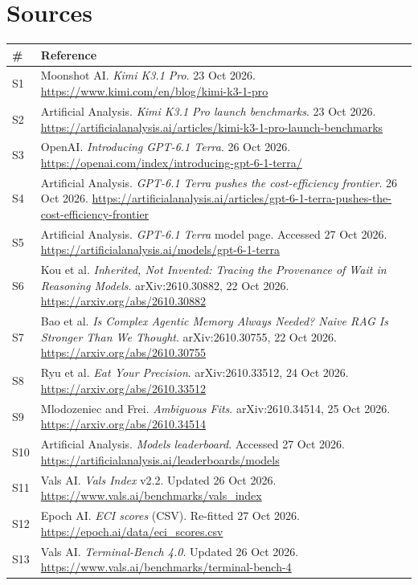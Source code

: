 \documentclass[11pt,a4paper]{article}
\begin{document}
\section{Sources}
{\footnotesize
\begin{tabularx}{\textwidth}{@{}l X@{}}
\toprule
\textbf{\#} & \textbf{Reference} \\
\midrule
S1  & Moonshot AI. \emph{Kimi K3.1 Pro}. 23 Oct 2026. \url{https://www.kimi.com/en/blog/kimi-k3-1-pro} \\
S2  & Artificial Analysis. \emph{Kimi K3.1 Pro launch benchmarks}. 23 Oct 2026. \url{https://artificialanalysis.ai/articles/kimi-k3-1-pro-launch-benchmarks} \\
S3  & OpenAI. \emph{Introducing GPT-6.1 Terra}. 26 Oct 2026. \url{https://openai.com/index/introducing-gpt-6-1-terra/} \\
S4  & Artificial Analysis. \emph{GPT-6.1 Terra pushes the cost-efficiency frontier}. 26 Oct 2026. \url{https://artificialanalysis.ai/articles/gpt-6-1-terra-pushes-the-cost-efficiency-frontier} \\
S5  & Artificial Analysis. \emph{GPT-6.1 Terra} model page. Accessed 27 Oct 2026. \url{https://artificialanalysis.ai/models/gpt-6-1-terra} \\
S6  & Kou et al. \emph{Inherited, Not Invented: Tracing the Provenance of Wait in Reasoning Models}. arXiv:2610.30882, 22 Oct 2026. \url{https://arxiv.org/abs/2610.30882} \\
S7  & Bao et al. \emph{Is Complex Agentic Memory Always Needed? Naive RAG Is Stronger Than We Thought}. arXiv:2610.30755, 22 Oct 2026. \url{https://arxiv.org/abs/2610.30755} \\
S8  & Ryu et al. \emph{Eat Your Precision}. arXiv:2610.33512, 24 Oct 2026. \url{https://arxiv.org/abs/2610.33512} \\
S9  & Mlodozeniec and Frei. \emph{Ambiguous Fits}. arXiv:2610.34514, 25 Oct 2026. \url{https://arxiv.org/abs/2610.34514} \\
S10 & Artificial Analysis. \emph{Models leaderboard}. Accessed 27 Oct 2026. \url{https://artificialanalysis.ai/leaderboards/models} \\
S11 & Vals AI. \emph{Vals Index} v2.2. Updated 26 Oct 2026. \url{https://www.vals.ai/benchmarks/vals_index} \\
S12 & Epoch AI. \emph{ECI scores} (CSV). Re-fitted 27 Oct 2026. \url{https://epoch.ai/data/eci_scores.csv} \\
S13 & Vals AI. \emph{Terminal-Bench 4.0}. Updated 26 Oct 2026. \url{https://www.vals.ai/benchmarks/terminal-bench-4} \\

\end{tabularx}}
\end{document}
